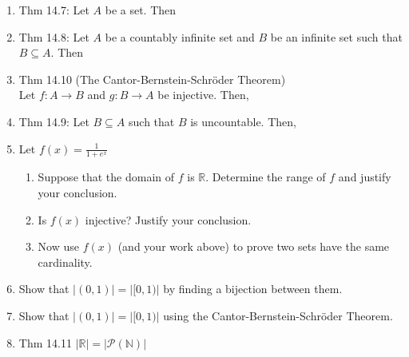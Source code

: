 \documentclass[12pt]{article}
\newcommand{\N}{\mathbb{N}}
\newcommand{\R}{\mathbb{R}}
\begin{document}
\begin{enumerate}
\item Thm 14.7: Let $A$ be a set. Then \quad {}\\
\vfill
\item Thm 14.8: Let $A$ be a countably infinite set and $B$ be an infinite set such that $B\subseteq A.$ Then \\
\vfill
\item Thm 14.10 (The Cantor-Bernstein-Schröder Theorem)\\
Let $f:A\to B$ and $g:B \to A$ be injective. Then, 
\vfill
\item Thm 14.9: Let $B \subseteq A$ such that $B$ is uncountable. Then, \\
\vfill
\item Let $f(x)=\frac{1}{1+e^x}$
	\begin{enumerate}
	\item Suppose that the domain of $f$ is $\R.$ Determine the range of $f$ and justify your conclusion.
	\vfill
	\item Is $f(x)$ injective? Justify your conclusion.
	\vfill
	\item Now use $f(x)$ (and your work above) to prove two sets have the same cardinality.
	\vfill
	\end{enumerate}
\newpage
\item Show that $|(0,1)|=|[0,1)|$ by finding a bijection between them.\\
\vfill
\item Show that $|(0,1)|=|[0,1)|$ using the Cantor-Bernstein-Schröder Theorem.\\
\vfill
\item Thm 14.11 $|\R|=|\mathcal{P}(\N)|$\\
\vspace{5in}
\newpage
\end{enumerate}
\end{document}
